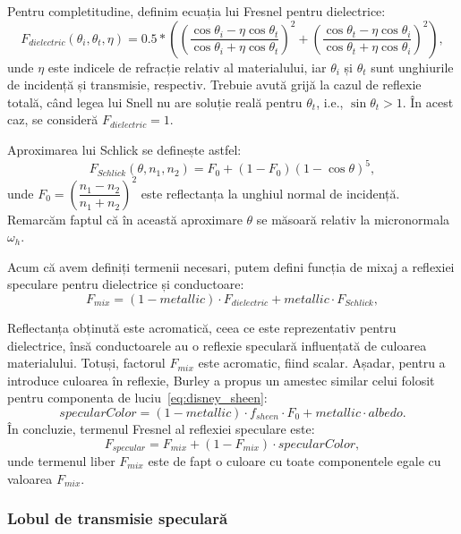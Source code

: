 \documentclass[12pt,a4paper]{report}
\numberwithin{equation}{section} %
\begin{document}
Pentru completitudine, definim ecuația lui Fresnel pentru dielectrice:
\begin{equation}
	F_{dielectric}(\theta_i, \theta_t, \eta) = 0.5 * \left(\left(\dfrac{\cos \theta_i - \eta\cos \theta_t}{\cos \theta_i + \eta\cos \theta_t}\right)^2 + \left(\dfrac{\cos \theta_t - \eta\cos \theta_i}{\cos \theta_t + \eta\cos \theta_i}\right)^2 \right),
\end{equation}
unde $\eta$ este indicele de refracție relativ al materialului, iar $\theta_i$ și $\theta_t$
sunt unghiurile de incidență și transmisie, respectiv. Trebuie avută grijă la
cazul de reflexie totală, când legea lui Snell nu are soluție reală pentru $\theta_t$, i.e., $\sin \theta_t > 1$.
În acest caz, se consideră $F_{dielectric} = 1$.

Aproximarea lui Schlick se definește astfel:
\begin{equation}
	F_{Schlick}(\theta, n_1, n_2) = F_0 + (1 - F_0)(1 - \cos \theta)^5,
\end{equation}
unde $F_0 = \left(\dfrac{n_1 - n_2}{n_1 + n_2}\right)^2$ este reflectanța la unghiul normal de incidență.
Remarcăm faptul că în această aproximare $\theta$ se măsoară relativ la micronormala $\omega_h$.

Acum că avem definiți termenii necesari, putem defini funcția de mixaj a reflexiei
speculare pentru dielectrice și conductoare:
\begin{equation}
	F_{mix} = (1 - metallic)\cdot F_{dielectric} + metallic\cdot F_{Schlick},
\end{equation}

Reflectanța obținută este acromatică, ceea ce este reprezentativ pentru dielectrice,
însă conductoarele au o reflexie speculară influențată de culoarea materialului. Totuși,
factorul $F_{mix}$ este acromatic, fiind scalar. Așadar, pentru a introduce culoarea în reflexie,
Burley a propus un amestec similar celui folosit pentru componenta de luciu~\ref{eq:disney_sheen}:
\begin{equation}
	specularColor = (1 - metallic)\cdot f_{sheen}\cdot F_0 + metallic\cdot albedo.
\end{equation}
În concluzie, termenul Fresnel al reflexiei speculare este:
\begin{equation}
	F_{specular} = F_{mix} + (1 - F_{mix})\cdot specularColor,
\end{equation}
unde termenul liber $F_{mix}$ este de fapt o culoare cu toate componentele egale cu valoarea
$F_{mix}$.

\subsubsection*{Lobul de transmisie speculară}
\end{document}
